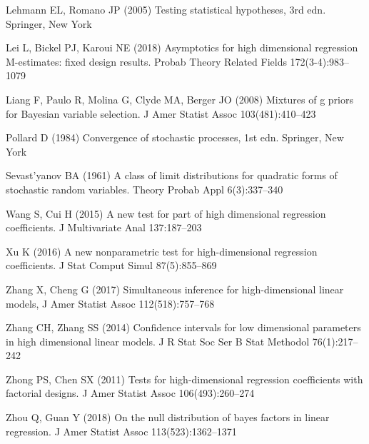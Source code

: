 \documentclass[smallextended]{svjour3}       %
\begin{document}
\begin{thebibliography}{}
Lehmann EL, Romano JP (2005) Testing statistical hypotheses, 3rd edn. Springer,
  New York

Lei L, Bickel PJ, Karoui NE (2018) Asymptotics for high dimensional regression
  M-estimates: fixed design results. Probab Theory Related Fields 172(3-4):983--1079

Liang F, Paulo R, Molina G, Clyde MA, Berger JO (2008) Mixtures of g priors for
  Bayesian variable selection. J Amer Statist Assoc 103(481):410--423

Pollard D (1984) Convergence of stochastic processes, 1st edn. Springer, New
  York

Sevast'yanov BA (1961) A class of limit distributions for quadratic forms of
  stochastic random variables. Theory Probab Appl
  6(3):337--340




Wang S, Cui H (2015) A new test for part of high dimensional regression
  coefficients. J Multivariate Anal 137:187--203

Xu K (2016) A new nonparametric test for high-dimensional regression
  coefficients. J Stat Comput Simul
  87(5):855--869

    Zhang X, Cheng G (2017) Simultaneous inference for high-dimensional linear models, J Amer Statist Assoc
    112(518):757--768

Zhang CH, Zhang SS (2014) Confidence intervals for low dimensional parameters
  in high dimensional linear models. J R Stat Soc Ser B Stat Methodol 76(1):217--242

Zhong PS, Chen SX (2011) Tests for high-dimensional regression coefficients
  with factorial designs. J Amer Statist Assoc
  106(493):260--274

Zhou Q, Guan Y (2018) On the null distribution of bayes factors in linear
  regression. J Amer Statist Assoc
  113(523):1362--1371
\end{thebibliography}
\end{document}
